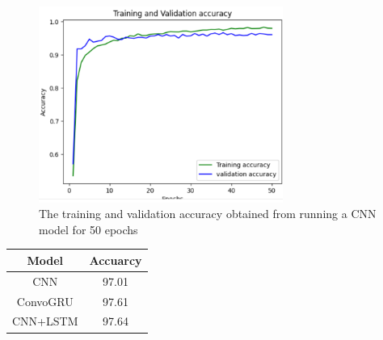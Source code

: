 \begin{figure}[htp]
    \centering
    \includegraphics[width=8cm]{report/image2.png}
    \caption{The training and validation accuracy obtained from running a CNN model for 50 epochs}
    \label{fig:galaxy}
\end{figure}


\begin{center}
\begin{tabular}{||c c||} 
\hline
 Model & Accuarcy \\ [0.5ex] 
 \hline\hline
 CNN &  97.01  \\ 
 \hline
 ConvoGRU & 97.61 \\
 \hline
 CNN+LSTM & 97.64 \\ [1ex] 
\hline
\end{tabular}
\end{center}
\begin{center}
\caption{Table showing the accuracy of three different models }
\end{center}
